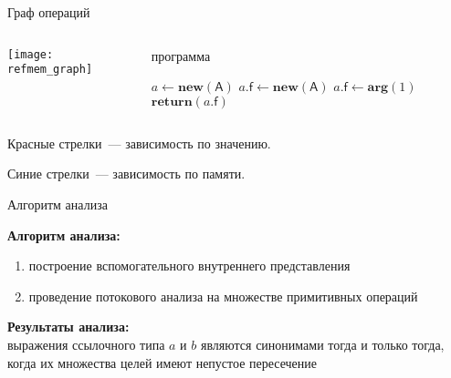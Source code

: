 \documentclass[usenames,dvipsnames,pdftex,unicode,hidelinks]{beamer}
\newcommand{\java}{\eng{Java}\xspace}
\newcommand{\type}[1]{\mathsf{#1}}
\newcommand{\field}[1]{\mathsf{#1}}
\newcommand{\op}[1]{\mathbf{#1}}
\begin{document}
\begin{frame}{Граф операций}

  \begin{columns}[t]
    \begin{column}[T]{0.67\textwidth}
      \texttt{[image: refmem\_graph]}
    \end{column}
    \begin{column}[T]{0.33\textwidth}
      \begin{block}{\java программа}
        \begin{algorithmic}[1]
          \State $a \gets \op{new}(\type{A})$
          \If{\ldots}
            \State $a.\field{f} \gets \op{new}(\type{A})$
          \Else
            \State $a.\field{f} \gets \op{arg}(1)$
          \EndIf
          \State $\op{return}(a.\field{f})$
        \end{algorithmic}
      \end{block}
    \end{column}
  \end{columns}

  \medskip
  \centerline{\small Красные стрелки~--- зависимость по значению.}
  \centerline{\small Синие стрелки~--- зависимость по памяти.}

\end{frame}

\begin{frame}{Алгоритм анализа}

  \textbf{Алгоритм анализа:}
  \begin{enumerate}
    \item построение вспомогательного внутреннего представления
    \item проведение потокового анализа на множестве примитивных операций
  \end{enumerate}

  \medskip
  \textbf{Результаты анализа:} \\
  выражения ссылочного типа $a$ и $b$ являются синонимами тогда и только тогда,
  когда их множества целей имеют непустое пересечение

\end{frame}
\end{document}
